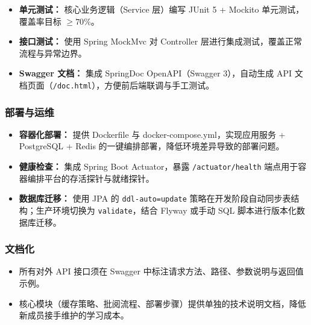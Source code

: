 \documentclass{../softeng}
\begin{document}
\begin{itemize}
    \item \textbf{单元测试：} 核心业务逻辑（Service 层）编写 JUnit 5 + Mockito 单元测试，覆盖率目标 $\ge 70\%$。
    \item \textbf{接口测试：} 使用 Spring MockMvc 对 Controller 层进行集成测试，覆盖正常流程与异常边界。
    \item \textbf{Swagger 文档：} 集成 SpringDoc OpenAPI（Swagger 3），自动生成 API 文档页面（\texttt{/doc.html}），方便前后端联调与手工测试。
\end{itemize}

\subsubsection{部署与运维}

\begin{itemize}
    \item \textbf{容器化部署：} 提供 Dockerfile 与 docker-compose.yml，实现应用服务 + PostgreSQL + Redis 的一键编排部署，降低环境差异导致的部署问题。
    \item \textbf{健康检查：} 集成 Spring Boot Actuator，暴露 \texttt{/actuator/health} 端点用于容器编排平台的存活探针与就绪探针。
    \item \textbf{数据库迁移：} 使用 JPA 的 \texttt{ddl-auto=update} 策略在开发阶段自动同步表结构；生产环境切换为 \texttt{validate}，结合 Flyway 或手动 SQL 脚本进行版本化数据库迁移。
\end{itemize}

\subsubsection{文档化}

\begin{itemize}
    \item 所有对外 API 接口须在 Swagger 中标注请求方法、路径、参数说明与返回值示例。
    \item 核心模块（缓存策略、批阅流程、部署步骤）提供单独的技术说明文档，降低新成员接手维护的学习成本。
\end{itemize}
\end{document}
